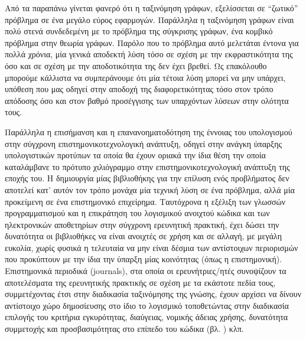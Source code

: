 Από τα παραπάνω γίνεται φανερό ότι η ταξινόμηση γράφων, εξελίσσεται σε ``ζωτικό'' πρόβλημα σε ένα μεγάλο εύρος εφαρμογών.
Παράλληλα η ταξινόμηση γράφων είναι πολύ στενά συνδεδεμένη με το πρόβλημα της σύγκρισης γράφων, ένα κομβικό πρόβλημα στην θεωρία γράφων.
Παρόλο που το πρόβλημα αυτό μελετάται έντονα για πολλά χρόνια, μία γενικά αποδεκτή λύση τόσο σε σχέση με την εκφραστικότητα της όσο και σε σχέση με την αποδοτικότητα της δεν έχει βρεθεί.
Ως επακόλουθο μπορούμε κάλλιστα να συμπεράνουμε ότι μία τέτοια λύση μπορεί να μην υπάρχει, υπόθεση που μας οδηγεί στην αποδοχή της διαφορετικότητας τόσο στον τρόπο απόδοσης όσο και στον βαθμό προσέγγισης των υπαρχόντων λύσεων στην ολότητα τους.\par
Παράλληλα η επισήμανση και η επανανοηματοδότηση της έννοιας του υπολογισμού στην σύγχρονη επιστημονικοτεχνολογική ανάπτυξη, οδηγεί στην ανάγκη ύπαρξης υπολογιστικών προτύπων τα οποία θα έχουν οριακά την ίδια θέση την οποία καταλάμβανε το πρότυπο χιλιόγραμμο στην επιστημονικοτεχνολογική ανάπτυξη της εποχής του.
Η δημιουργία μίας βιβλιοθήκης για την επίλυση ενός προβλήματος δεν αποτελεί κατ' αυτόν τον τρόπο μονάχα μία τεχνική λύση σε ένα πρόβλημα, αλλά μία προκείμενη σε ένα επιστημονικό επιχείρημα.
Ταυτόχρονα η εξέλιξη των γλωσσών προγραμματισμού και η επικράτηση του λογισμικού ανοιχτού κώδικα και των ηλεκτρονικών αποθετηρίων στην σύγχρονη ερευνητική πρακτική, έχει δώσει την δυνατότητα οι βιβλιοθήκες να είναι ανοιχτές σε χρήση και σε αλλαγή, με μεγάλη ευκολία, χωρίς φυσικά η τελευταία να μην είναι δέσμια των αντίστοιχων περιορισμών που προκύπτουν με την ίδια την ύπαρξη μίας κοινότητας (όπως η επιστημονική).
Επιστημονικά περιοδικά (journals), στα οποία οι ερευνήτριες/ητές συνοψίζουν τα αποτελέσματα της ερευνητικής πρακτικής σε σχέση με τα εκάστοτε πεδία τους, συμμετέχοντας έτσι στην διαδικασία ταξινόμησης της γνώσης, έχουν αρχίσει να δίνουν αντίστοιχο χώρο δημοσίευσης στο ίδιο το λογισμικό τοποθετώντας στην διαδικασία επιλογής του κριτήρια εγκυρότητας, διαύγειας, νομικής άδειας χρήσης, δυνατότητα συμμετοχής και προσβασιμότητας στο επίπεδο του κώδικα (βλ. \href{http://www.jmlr.org/mloss/mloss-info.html}{}) κλπ.

